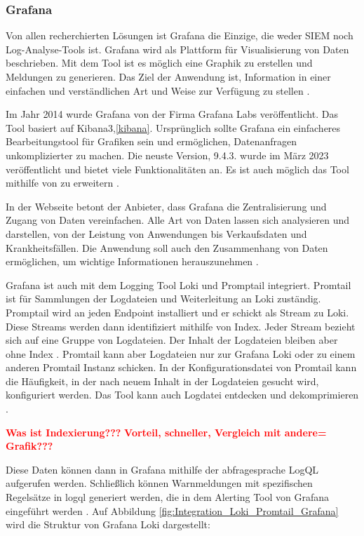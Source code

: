 \subsubsection{Grafana}
Von allen recherchierten Lösungen ist Grafana die Einzige, die weder \gls{SIEM} noch Log-Analyse-Tools ist. Grafana wird als Plattform für Visualisierung von Daten beschrieben. Mit dem Tool ist es möglich eine Graphik zu erstellen und Meldungen zu generieren. Das Ziel der Anwendung ist, Information in einer einfachen und verständlichen Art und Weise zur Verfügung zu stellen \citep{redhat_grafana}.  

Im Jahr 2014 wurde Grafana von der Firma Grafana Labs veröffentlicht. Das Tool basiert auf Kibana3,\ref{kibana}. Ursprünglich sollte Grafana ein einfacheres Bearbeitungstool für Grafiken sein und ermöglichen, Datenanfragen unkomplizierter zu machen. Die neuste Version, 9.4.3. wurde im März 2023 veröffentlicht und bietet viele Funktionalitäten an. Es ist auch möglich das Tool mithilfe von   zu erweitern \citep{Oedegaard_historyGrafana}.

In der Webseite betont der Anbieter, dass Grafana die Zentralisierung und Zugang von Daten vereinfachen. Alle Art von Daten lassen sich analysieren und darstellen, von der Leistung von Anwendungen bis Verkaufsdaten und Krankheitsfällen. Die Anwendung soll auch den Zusammenhang von Daten ermöglichen, um wichtige Informationen herauszunehmen \citep{Grafana_Grafana}.

Grafana ist auch mit dem Logging Tool Loki und Promptail integriert. Promtail ist für Sammlungen der Logdateien und Weiterleitung an Loki zuständig. Promptail wird an jeden \gls{Endpoint} installiert und er schickt als Stream zu Loki. Diese Streams werden dann identifiziert mithilfe von Index. Jeder Stream bezieht sich auf eine Gruppe von Logdateien. Der Inhalt der Logdateien bleiben aber ohne Index \citep{Grafana_fundamentals}. Promtail kann aber Logdateien nur zur Grafana Loki oder zu einem anderen Promtail Instanz schicken. In der Konfigurationsdatei von Promtail kann die Häufigkeit, in der nach neuem Inhalt in der Logdateien gesucht wird, konfiguriert werden. Das Tool kann auch Logdatei entdecken und dekomprimieren \citep{Grafana_Promtail}. 

\textbf{\textcolor{red}{Was ist Indexierung???}}
\textbf{\textcolor{red}{Vorteil, schneller, Vergleich mit andere=}}
\textbf{\textcolor{red}{Grafik???}}

Diese Daten können dann in Grafana mithilfe der \gls{abfragesprache} LogQL aufgerufen werden. Schließlich können Warnmeldungen mit spezifischen Regelsätze in \gls{logql} generiert werden, die in dem Alerting Tool von Grafana eingeführt werden \citep{Grafana_loki}. Auf Abbildung \ref{fig:Integration_Loki_Promtail_Grafana} wird die Struktur von Grafana Loki  dargestellt:



